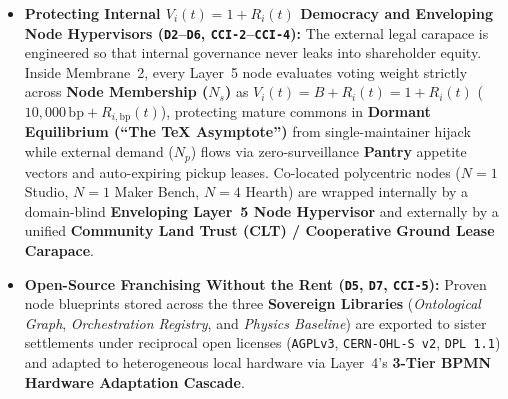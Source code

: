\begin{itemize}
    \item \textbf{Protecting Internal $V_i(t) = 1 + R_i(t)$ Democracy and Enveloping Node Hypervisors (\texttt{D2}--\texttt{D6}, \texttt{CCI-2}--\texttt{CCI-4}):} The external legal carapace is engineered so that internal governance never leaks into shareholder equity. Inside Membrane~2, every Layer~5 node evaluates voting weight strictly across \textbf{Node Membership ($N_s$)} as $V_i(t) = B + R_i(t) = 1 + R_i(t)$ ($10{,}000\,\mathrm{bp} + R_{i,\mathrm{bp}}(t)$), protecting mature commons in \textbf{Dormant Equilibrium (``The \TeX{} Asymptote'')} from single-maintainer hijack while external demand ($N_p$) flows via zero-surveillance \textbf{Pantry} appetite vectors and auto-expiring pickup leases. Co-located polycentric nodes ($N=1$ Studio, $N=1$ Maker Bench, $N=4$ Hearth) are wrapped internally by a domain-blind \textbf{Enveloping Layer~5 Node Hypervisor} and externally by a unified \textbf{Community Land Trust (CLT) / Cooperative Ground Lease Carapace}.
    \item \textbf{Open-Source Franchising Without the Rent (\texttt{D5}, \texttt{D7}, \texttt{CCI-5}):} Proven node blueprints stored across the three \textbf{Sovereign Libraries} (\textit{Ontological Graph}, \textit{Orchestration Registry}, and \textit{Physics Baseline}) are exported to sister settlements under reciprocal open licenses (\texttt{AGPLv3}, \texttt{CERN-OHL-S v2}, \texttt{DPL 1.1}) and adapted to heterogeneous local hardware via Layer~4's \textbf{3-Tier BPMN Hardware Adaptation Cascade}.
\end{itemize}

